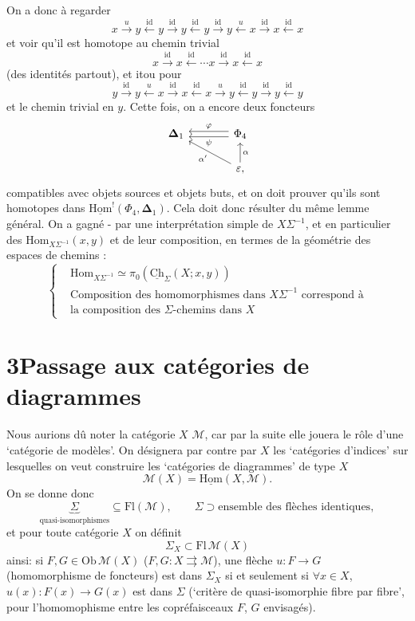 \documentclass[11pt]{article}
\newcommand{\printedpage}[1]{\marginpar{\footnotesize p.~#1}}
\newcommand{\msp}[1]{\marginpar{\footnotesize [#1]}}
\newcommand{\uHom}{\underline{\mathrm{Hom}}}
\newcommand{\Hom}{\mathrm{Hom}}
\newcommand{\bDelta}{\boldsymbol{\Delta}}
\newcommand{\uCh}{\underline{\mathrm{Ch}}}
\begin{document}
On a donc à regarder
\[
x \xrightarrow{u} y \xleftarrow{\mathrm{id}} y \xrightarrow{\mathrm{id}} y \xleftarrow{\mathrm{id}} y \xrightarrow{\mathrm{id}} y \xleftarrow{u} x \xrightarrow{\mathrm{id}} x \xleftarrow{\mathrm{id}} x
\]
et voir qu'il est homotope au chemin trivial
\[
x \xrightarrow{\mathrm{id}} x \xleftarrow{\mathrm{id}} \cdots x \xrightarrow{\mathrm{id}} x \xleftarrow{\mathrm{id}} x
\]
(des identités partout), et itou pour
\[
y \xrightarrow{\mathrm{id}} y \xleftarrow{u} x \xrightarrow{\mathrm{id}} x \xleftarrow{\mathrm{id}} x \xrightarrow{u} y \xleftarrow{\mathrm{id}} y \xrightarrow{\mathrm{id}} y \xleftarrow{\mathrm{id}} y
\]
et le chemin trivial en $y$. Cette fois, on a encore deux foncteurs
\[
\begin{tikzcd}[column sep=large]
\bDelta_1 & \Phi_4 \arrow[l, shift right, "\varphi"'] \arrow[l, shift left, "\psi"] \\
& \varepsilon, \arrow[ul, "\alpha'"] \arrow[u, "\alpha"']
\end{tikzcd}
\]
compatibles avec objets sources et objets buts, et on doit prouver qu'ils sont homotopes dans $\uHom^!(\Phi_4, \bDelta_1)$. Cela doit donc résulter du même lemme général. On a gagné - par une interprétation simple de $X\Sigma^{-1}$, et en particulier des $\Hom_{X\Sigma^{-1}}(x,y)$ et de leur composition, en termes de la géométrie des espaces de chemins :
\[
\left\{
\begin{aligned}
&\Hom_{X\Sigma^{-1}} \simeq \pi_0(\uCh_\Sigma(X;x,y)) \\ %
&\text{Composition des homomorphismes dans } X\Sigma^{-1} \text{ correspond à} \\
&\text{la composition des } \Sigma\text{-chemins dans } X
\end{aligned}
\right.
\]

\printedpage{18}
\noindent\msp{page 28}

\section*{3\quad Passage aux catégories de diagrammes}

Nous aurions dû noter la catégorie $X$ $\mathcal{M}$, car par la suite elle jouera le rôle d'une `catégorie de modèles'. On désignera par contre par $X$ les `catégories d'indices' sur lesquelles on veut construire les `catégories de diagrammes' de type $X$
\[
\mathcal{M}(X) = \uHom(X,\mathcal{M}).
\]
On se donne donc
\[
\underbrace{\Sigma}_{\text{quasi-isomorphismes}} \subseteq \mathrm{Fl}(\mathcal{M}), \qquad \Sigma \supset \text{ensemble des flèches identiques},
\]
et pour toute catégorie $X$ on définit
\[
\Sigma_X \subset \mathrm{Fl}\,\mathcal{M}(X)
\]
ainsi: si $F, G \in \mathrm{Ob}\,\mathcal{M}(X)$ ($F, G : X \rightrightarrows \mathcal{M}$), une flèche $u : F \longrightarrow G$ (homomorphisme de foncteurs) est dans $\Sigma_X$ si et seulement si $\forall x \in X$, $u(x) : F(x) \longrightarrow G(x)$ est dans $\Sigma$ (`critère de quasi-isomorphie fibre par fibre', pour l'homomophisme entre les copréfaisceaux $F$, $G$ envisagés). %
\end{document}
